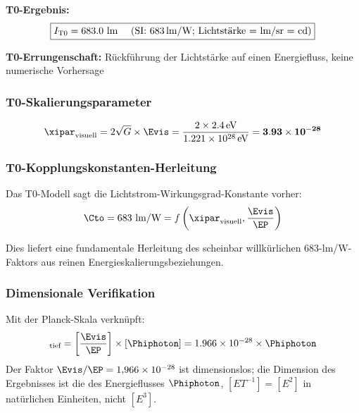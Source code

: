 	\textbf{T0-Ergebnis:}
	\begin{equation}
		\boxed{I_{\text{T0}} = 683.0 \text{ lm \quad (SI: 683\,lm/W; Lichtstärke = lm/sr = cd)}}
		\label{eq:candela_t0_ergebnis}
	\end{equation}
	
	\textbf{T0-Errungenschaft:} Rückführung der Lichtstärke auf einen Energiefluss, keine numerische Vorhersage
	
	\subsubsection{T0-Skalierungsparameter}
	\label{subsubsec:candela_skalierungsparameter}
	
	\begin{equation}
		\xipar_{\text{visuell}} = 2\sqrt{G} \times \Evis = \frac{2 \times 2.4\,\text{eV}}{1.221 \times 10^{28}\,\text{eV}} = \mathbf{3.93 \times 10^{-28}}
		\label{eq:xi_visuell_berechnet}
	\end{equation}
	
	\subsubsection{T0-Kopplungs\-konstanten-Herleitung}
	\label{subsubsec:t0_kopplungsherleitung}
	
	Das T0-Modell sagt die Lichtstrom-Wirkungsgrad-Konstante vorher:
	\begin{equation}
		\Cto = 683 \text{ lm/W} = f\left(\xipar_{\text{visuell}}, \frac{\Evis}{\EP}\right)
		\label{eq:t0_kopplungsvorhersage}
	\end{equation}
	
	Dies liefert eine fundamentale Herleitung des scheinbar willkürlichen 683-lm/W-Faktors aus reinen Energieskalierungsbeziehungen.
	
	\subsubsection{Dimensionale Verifikation}
	\label{subsubsec:candela_dimensionale_verifikation}
	
	Mit der Planck-Skala verknüpft:
	\begin{equation}
		[I_{\text{T0}}]_{\text{tief}} = \left[\frac{\Evis}{\EP}\right] \times [\Phiphoton] = 1.966 \times 10^{-28} \times \Phiphoton
		\label{eq:candela_e3_dimension}
	\end{equation}
	Der Faktor $\Evis/\EP = 1{,}966\times10^{-28}$ ist dimensionslos; die Dimension des Ergebnisses ist die des Energieflusses $\Phiphoton$, $[E T^{-1}] = [E^2]$ in natürlichen Einheiten, nicht $[E^3]$.
	
